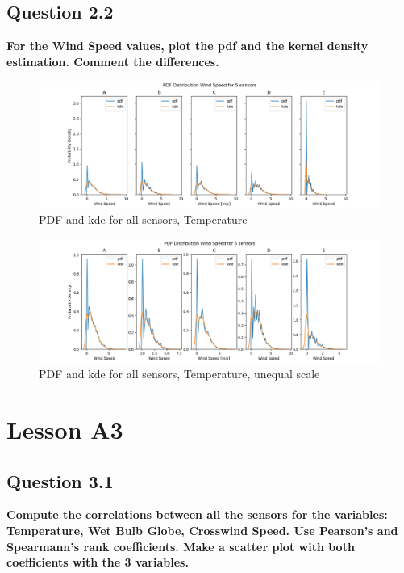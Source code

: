 \documentclass{report}
\begin{document}
	\subsection{Question 2.2}
	\textbf{For the Wind Speed values, plot the pdf and the kernel density estimation. Comment the differences.}
	
	
	\begin{figure}[h!]
		\centering
		\includegraphics[width=\linewidth]{GEO1001_hw01_images/GEO1001_hw01_A2_kde_compare.png}
		\caption{PDF and kde for all sensors, Temperature}
		\label{fig:kde}
	\end{figure}

	\begin{figure}[h!]
		\centering
		\includegraphics[width=\linewidth]{GEO1001_hw01_images/GEO1001_hw01_A2_kde_original.png}
		\caption{PDF and kde for all sensors, Temperature, unequal scale}
		\label{fig:kdeunequal}
	\end{figure}
	
	\section{Lesson A3}
	
	\subsection{Question 3.1}
	\textbf{Compute the correlations between all the sensors for the variables: Temperature, Wet Bulb Globe, Crosswind Speed. Use Pearson’s and Spearmann’s rank coefficients. Make a scatter plot with both coefficients with the 3 variables.}
	
\end{document}
